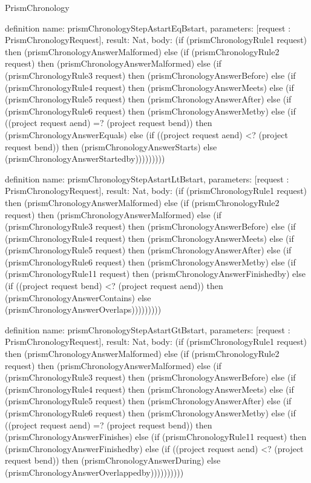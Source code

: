 \begin{lexlean}{PrismChronology}
\begin{semanticmodule}
definition{
  name: prismChronologyStepAstartEqBstart,
  parameters: [request : PrismChronologyRequest],
  result: Nat,
  body: (if (prismChronologyRule1 request) then (prismChronologyAnswerMalformed) else (if (prismChronologyRule2 request) then (prismChronologyAnswerMalformed) else (if (prismChronologyRule3 request) then (prismChronologyAnswerBefore) else (if (prismChronologyRule4 request) then (prismChronologyAnswerMeets) else (if (prismChronologyRule5 request) then (prismChronologyAnswerAfter) else (if (prismChronologyRule6 request) then (prismChronologyAnswerMetby) else (if ((project request aend) =? (project request bend)) then (prismChronologyAnswerEquals) else (if ((project request aend) <? (project request bend)) then (prismChronologyAnswerStarts) else (prismChronologyAnswerStartedby)))))))))
}

definition{
  name: prismChronologyStepAstartLtBstart,
  parameters: [request : PrismChronologyRequest],
  result: Nat,
  body: (if (prismChronologyRule1 request) then (prismChronologyAnswerMalformed) else (if (prismChronologyRule2 request) then (prismChronologyAnswerMalformed) else (if (prismChronologyRule3 request) then (prismChronologyAnswerBefore) else (if (prismChronologyRule4 request) then (prismChronologyAnswerMeets) else (if (prismChronologyRule5 request) then (prismChronologyAnswerAfter) else (if (prismChronologyRule6 request) then (prismChronologyAnswerMetby) else (if (prismChronologyRule11 request) then (prismChronologyAnswerFinishedby) else (if ((project request bend) <? (project request aend)) then (prismChronologyAnswerContains) else (prismChronologyAnswerOverlaps)))))))))
}

definition{
  name: prismChronologyStepAstartGtBstart,
  parameters: [request : PrismChronologyRequest],
  result: Nat,
  body: (if (prismChronologyRule1 request) then (prismChronologyAnswerMalformed) else (if (prismChronologyRule2 request) then (prismChronologyAnswerMalformed) else (if (prismChronologyRule3 request) then (prismChronologyAnswerBefore) else (if (prismChronologyRule4 request) then (prismChronologyAnswerMeets) else (if (prismChronologyRule5 request) then (prismChronologyAnswerAfter) else (if (prismChronologyRule6 request) then (prismChronologyAnswerMetby) else (if ((project request aend) =? (project request bend)) then (prismChronologyAnswerFinishes) else (if (prismChronologyRule11 request) then (prismChronologyAnswerFinishedby) else (if ((project request aend) <? (project request bend)) then (prismChronologyAnswerDuring) else (prismChronologyAnswerOverlappedby))))))))))
}


\end{semanticmodule}
\end{lexlean}
